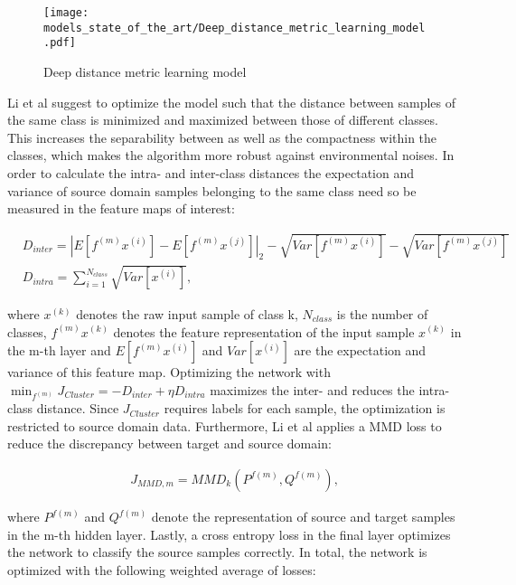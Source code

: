\begin{figure}[H]
  \centering
  \texttt{[image: models\_state\_of\_the\_art/Deep\_distance\_metric\_learning\_model.pdf]}
  \caption{Deep distance metric learning model \cite{Li2018}}
  \label{fig:Deep_distance_metric_learning_model}
\end{figure}

Li et al suggest to optimize the model such that the distance between samples of the same class is minimized and maximized between those of different classes. This increases the separability between as well as the compactness within the classes, which makes the algorithm more robust against environmental noises. In order to calculate the intra- and inter-class distances the expectation and variance of source domain samples belonging to the same class need so be measured in the feature maps of interest:

\begin{equation}
    \begin{aligned}
       &D_{inter} = |E[f^{(m)}x^{(i)}]-E[f^{(m)}x^{(j)}]|_{2}-\sqrt{Var[f^{(m)}x^{(i)}]}-\sqrt{Var[f^{(m)}x^{(j)}]}\\
       &D_{intra} = 
        \sum_{i=1}^{N_{class}} \sqrt{Var[x^{(i)}]},
    \end{aligned}
\end{equation}

where $x^{(k)}$ denotes the raw input sample of class k, $N_{class}$ is the number of classes, $f^{(m)}x^{(k)}$ denotes the feature representation of the input sample $x^{(k)}$ in the m-th layer and $E[f^{(m)}x^{(i)}]$ and $Var[x^{(i)}]$ are the  expectation and variance of this feature map. Optimizing the network with $\min_{f^{(m)}}J_{Cluster} = - D_{inter} + \eta D_{intra}$ maximizes the inter- and reduces the intra-class distance. Since $J_{Cluster}$  requires labels for each sample, the optimization is restricted to source domain data. Furthermore, Li et al applies a MMD loss to reduce the discrepancy between target and source domain: 

\begin{equation}
    \begin{aligned}
    J_{MMD,m} = MMD_{k}(P^{f(m)}, Q^{f(m)}),
    \end{aligned}
\end{equation}

where $P^{f(m)}$ and $Q^{f(m)}$ denote the representation of source and target samples in the m-th hidden layer. Lastly, a cross entropy loss in the final layer optimizes the network to classify the source samples correctly. In total, the network is optimized with the following weighted average of losses: 

